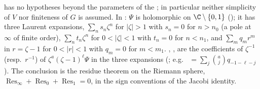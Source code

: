 \begin{dictionary}
 has no hypotheses beyond the parameters of the ; in particular neither
simplicity of $V$ nor finiteness of $G$ is assumed. In : $\Psi$ is holomorphic on
$\C\setminus\{0,1\}$ (); it has three Laurent expansions, $\sum_ns_n\zeta^n$ for $|\zeta|>1$
with $s_n=0$ for $n>n_0$ (a pole at $\infty$ of finite order), $\sum_nt_n\zeta^n$ for $0<|\zeta|<1$ with $t_n=0$ for
$n<n_1$, and $\sum_mq_m r^m$ in $r=\zeta-1$ for $0<|r|<1$ with $q_m=0$ for $m<m_1$. ,
,  are the coefficients of $\zeta^{-1}$ (resp.\ $r^{-1}$) of
$\zeta^a(\zeta-1)^{\ell}\Psi$ in the three expansions (; e.g.\ 
$=\sum_j\binom aj q_{-1-\ell-j}$). The conclusion is the residue theorem on the Riemann sphere,
$\operatorname{Res}_\infty+\operatorname{Res}_0+\operatorname{Res}_1=0$, in the sign conventions of the Jacobi identity.
\end{dictionary}


